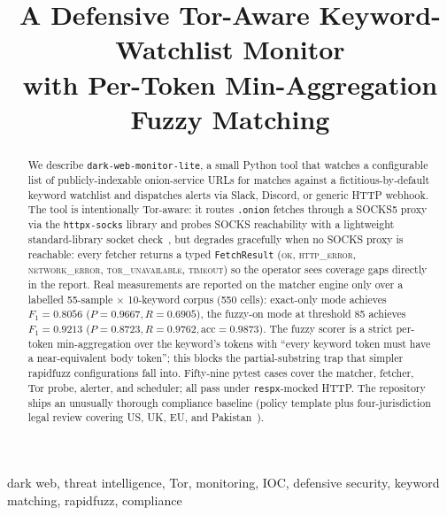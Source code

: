 \documentclass[conference]{IEEEtran}
\begin{document}
\title{A Defensive Tor-Aware Keyword-Watchlist Monitor\\with
Per-Token Min-Aggregation Fuzzy Matching}

\author{
}

\maketitle

\begin{abstract}
We describe \texttt{dark-web-monitor-lite}, a small Python tool that
watches a configurable list of publicly-indexable onion-service URLs
for matches against a fictitious-by-default keyword watchlist and
dispatches alerts via Slack, Discord, or generic HTTP webhook. The
tool is intentionally Tor-aware: it routes \texttt{.onion} fetches
through a SOCKS5 proxy via the \texttt{httpx-socks} library and probes
SOCKS reachability with a lightweight standard-library socket check~\cite{owen2016tor},
but degrades gracefully when no SOCKS proxy is reachable: every
fetcher returns a typed \texttt{FetchResult} (\textsc{ok},
\textsc{http\_error}, \textsc{network\_error},
\textsc{tor\_unavailable}, \textsc{timeout}) so the operator sees
coverage gaps directly in the report. Real measurements are
reported on the matcher engine only over a labelled 55-sample $\times$
10-keyword corpus (550 cells): exact-only mode achieves
$F_{1}=0.8056$ ($P{=}0.9667, R{=}0.6905$), the fuzzy-on mode at
threshold 85 achieves $F_{1}=0.9213$ ($P{=}0.8723,
R{=}0.9762, \text{acc}{=}0.9873$). The fuzzy scorer is a strict
per-token min-aggregation over the keyword's tokens with
``every keyword token must have a near-equivalent body token'';
this blocks the partial-substring trap that simpler rapidfuzz
configurations fall into. Fifty-nine pytest cases cover the matcher,
fetcher, Tor probe, alerter, and scheduler; all pass under
\texttt{respx}-mocked HTTP. The repository ships an unusually
thorough compliance baseline (policy template plus four-jurisdiction
legal review covering US, UK, EU, and
Pakistan~\cite{nist_sp_800_150,christin2013silkroad}).
\end{abstract}

\begin{IEEEkeywords}
dark web, threat intelligence, Tor, monitoring, IOC, defensive
security, keyword matching, rapidfuzz, compliance
\end{IEEEkeywords}
\end{document}
